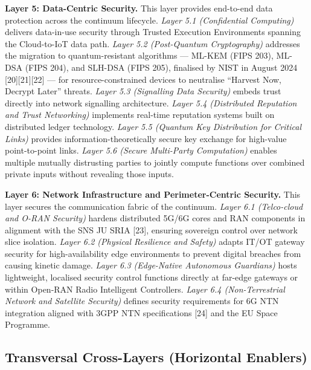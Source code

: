 \documentclass{ieeeaccess}
\begin{document}
\textbf{Layer 5: Data-Centric Security.} This layer provides end-to-end
data protection across the continuum lifecycle. \emph{Layer 5.1
(Confidential Computing)} delivers data-in-use security through Trusted
Execution Environments spanning the Cloud-to-IoT data path. \emph{Layer
5.2 (Post-Quantum Cryptography)} addresses the migration to
quantum-resistant algorithms --- ML-KEM (FIPS 203), ML-DSA (FIPS 204),
and SLH-DSA (FIPS 205), finalised by NIST in August 2024
{[}20{]}{[}21{]}{[}22{]} --- for resource-constrained devices to
neutralise ``Harvest Now, Decrypt Later'' threats. \emph{Layer 5.3
(Signalling Data Security)} embeds trust directly into network
signalling architecture. \emph{Layer 5.4 (Distributed Reputation and
Trust Networking)} implements real-time reputation systems built on
distributed ledger technology. \emph{Layer 5.5 (Quantum Key Distribution
for Critical Links)} provides information-theoretically secure key
exchange for high-value point-to-point links. \emph{Layer 5.6 (Secure
Multi-Party Computation)} enables multiple mutually distrusting parties
to jointly compute functions over combined private inputs without
revealing those inputs.

\textbf{Layer 6: Network Infrastructure and Perimeter-Centric Security.}
This layer secures the communication fabric of the continuum.
\emph{Layer 6.1 (Telco-cloud and O-RAN Security)} hardens distributed
5G/6G cores and RAN components in alignment with the SNS JU SRIA
{[}23{]}, ensuring sovereign control over network slice isolation.
\emph{Layer 6.2 (Physical Resilience and Safety)} adapts IT/OT gateway
security for high-availability edge environments to prevent digital
breaches from causing kinetic damage. \emph{Layer 6.3 (Edge-Native
Autonomous Guardians)} hosts lightweight, localised security control
functions directly at far-edge gateways or within Open-RAN Radio
Intelligent Controllers. \emph{Layer 6.4 (Non-Terrestrial Network and
Satellite Security)} defines security requirements for 6G NTN
integration aligned with 3GPP NTN specifications {[}24{]} and the EU
Space Programme.

\subsection{Transversal Cross-Layers (Horizontal
Enablers)}\label{transversal-cross-layers-horizontal-enablers}
\end{document}
